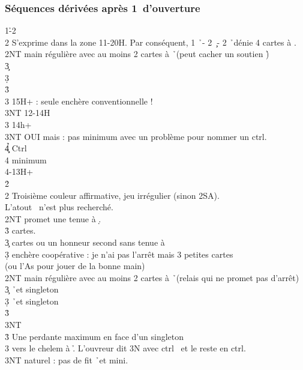 \documentclass[a4paper]{article}
\begin{document}
\subsubsection{Séquences dérivées après 1\pdfh\ d’ouverture}

\begin{bidtable}
1\h-2\c\\
2\s \> S’exprime dans la zone 11-20H. Par conséquent, 1 \h\ - 2 \c\ - 2 \h\ dénie 4 cartes à \s .\+\\
2NT \> main régulière avec au moins 2 cartes à \h\ (peut cacher un soutien \h )\+\\
3\c {}\\
3\d {}\\
3\h {}\\
3\s {} 15H+ : seule enchère conventionnelle !\\
3NT  12-14H\-\\
3\s \> 14h+\+\\
3NT \> OUI mais : pas minimum avec un problème pour nommer un ctrl.\\
4\c\d\h \> Ctrl\\
4\s \> minimum\-\\
4\s {}-13H+\-\\
2\h\+\\
2\s \> Troisième couleur affirmative, jeu irrégulier (sinon 2SA).\+\\
L’atout \> \s\ n’est plus recherché.\\
2NT \> promet une tenue à \d .\\
3\h {} cartes.\\
3\c {} cartes ou un honneur second sans tenue à \d \\
3\d \> enchère coopérative : je n’ai pas l’arrêt mais 3 petites cartes\+\\
(ou \> l’As pour jouer de la bonne main)\-\-\\
2NT \> main régulière avec au moins 2 cartes à \h\ (relais qui ne promet pas d'arrêt)\+\\
3\c {} \h\ et singleton \c \\
3\d {} \h\ et singleton \d \\
3\h {}\\
3NT \-\-\\
3\h \> Une perdante maximum en face d'un singleton\+\\
3\s \> vers le chelem à \h . L'ouvreur dit 3N avec ctrl \s\ et le reste en ctrl.\\
3NT \> naturel : pas de fit \h\ et mini.\\

\end{bidtable}
\end{document}
